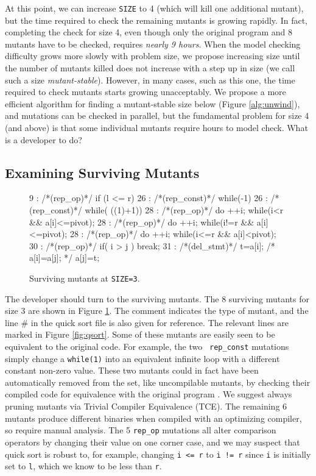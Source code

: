 \documentclass[conference]{IEEEtran}
\begin{document}
At this point, we can increase {\tt SIZE} to 4 (which will kill one
additional mutant), but the time required to check the remaining
mutants is growing rapidly.  In fact, completing the check for size 4,
even though only the original program and 8 mutants have to be
checked, requires \emph{nearly 9 hours}.  When the model checking
difficulty grows more slowly with problem size, we propose increasing
size until the number of mutants killed does not increase with a step
up in size (we call such a size \emph{mutant-stable}).  However, in
many cases, such as this one, the time required to check mutants
starts growing unacceptably.  We propose a more efficient algorithm
for finding a mutant-stable size below (Figure \ref{alg:unwind}), and
mutations can be checked in parallel, but the fundamental problem for
size 4 (and above) is that some individual mutants require hours to
model check.  What is a developer
to do?


\subsection{Examining Surviving Mutants}
\label{sec:maxcover}


\begin{figure}
{\scriptsize
\begin{code}
 9 :   /*(rep\_op)*/ if (l <= r) 
 26 :  /*(rep\_const)*/ while(-1)
 26 :  /*(rep\_const)*/ while( ((1)+1))
 28 :  /*(rep\_op)*/ do ++i; while(i<r \&\& a[i]<=pivot);
 28 :  /*(rep\_op)*/ do ++i; while(i!=r \&\& a[i]<=pivot);
 28 :  /*(rep\_op)*/ do ++i; while(i<=r \&\& a[i]<pivot);
 30 :  /*(rep\_op)*/ if( i > j ) break;
 31 :  /*(del\_stmt)*/ t=a[i]; /*  a[i]=a[j]; */  a[j]=t;
\end{code}
}
\caption{Surviving mutants at {\tt SIZE=3}.}
\label{fig:survivors}
\end{figure}

The developer should turn to the surviving mutants.  The 8 surviving  
mutants for size 3 are shown in Figure \ref{fig:survivors}.  
The comment indicates the type of mutant, and the line \# in the quick
sort file is also given for reference.  The relevant lines are marked
in Figure \ref{fig:qsort}.  Some of these mutants are easily seen to
be equivalent to the original code.  For example, the two {\tt
  rep\_const} mutations simply change a {\tt while(1)} into an
equivalent infinite loop with a different constant non-zero value.
These two mutants could in fact have been automatically removed from
the set, like uncompilable mutants, by checking their compiled code
for equivalence with the original program \cite{TCE}.  We suggest
always pruning mutants via Trivial Compiler Equivalence (TCE).  The remaining 6 mutants produce different
binaries when compiled with an optimizing compiler, so require manual
analysis.  The 5 {\tt rep\_op} mutations all alter comparison
operators by changing their value on one corner case, and we may suspect that quick sort is robust to,
for example, changing {\tt i <= r} to {\tt i != r} since {\tt i} is
initially set to {\tt l}, which we know to be less than {\tt r}.
\end{document}
